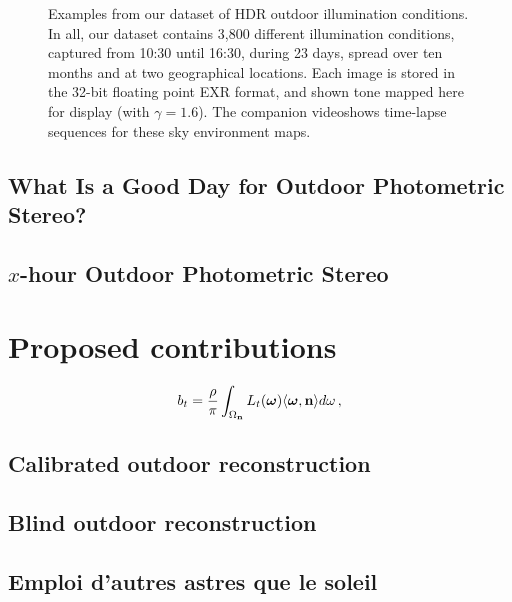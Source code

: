 \documentclass{report}
\begin{document}
\begin{figure}[!th]
\begin{tabular}{@{}rcccccccccccc@{}}
    \\

    \end{tabular}
   	\caption[]{Examples from our dataset of HDR outdoor illumination conditions. In all, our dataset contains 3,800 different illumination conditions, captured from 10:30 until 16:30, during 23 days, spread over ten months and at two geographical locations. Each image is stored in the 32-bit floating point EXR format, and shown tone mapped here for display (with $\gamma = 1.6$). The companion video\footnotemark shows time-lapse sequences for these sky environment maps.}
	\label{fig:database}
\end{figure}

\section{What Is a Good Day for Outdoor Photometric Stereo?}
\label{iccp15}

%

\section{$x$-hour Outdoor Photometric Stereo}
\label{3dv15}

%


\chapter{Proposed contributions}


\begin{equation}
b_t = \frac{\rho}{\pi} \int_{\Omega_{\mathbf n}} L_t(\mathbf{\boldsymbol \omega}) \langle \boldsymbol \omega, {\mathbf n} \rangle d\omega \,,
\end{equation}

\section{Calibrated outdoor reconstruction}

\section{Blind outdoor reconstruction}

\section{Emploi d'autres astres que le soleil}
\end{document}
